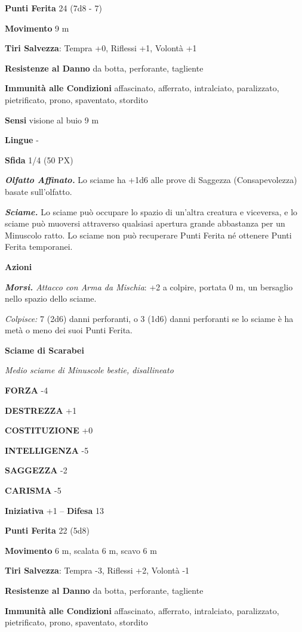 \begin{multicols}{2}
\textbf{Punti Ferita} 24 (7d8 - 7)

\textbf{Movimento} 9 m

\textbf{Tiri Salvezza}: Tempra +0, Riflessi +1, Volontà +1

\textbf{Resistenze al Danno} da botta, perforante, tagliente

\textbf{Immunità alle Condizioni} affascinato, afferrato, intralciato, paralizzato, pietrificato, prono, spaventato, stordito

\textbf{Sensi} visione al buio 9 m

\textbf{Lingue} -

\textbf{Sfida} 1/4 (50 PX)

\textit{\textbf{Olfatto Affinato.}} Lo sciame ha +1d6 alle prove di Saggezza (Consapevolezza) basate sull'olfatto.

\textit{\textbf{Sciame.}} Lo sciame può occupare lo spazio di un'altra creatura e viceversa, e lo sciame può muoversi attraverso qualsiasi apertura grande abbastanza per un Minuscolo ratto. Lo sciame non può recuperare Punti Ferita né ottenere Punti Ferita temporanei.

\textbf{Azioni}

\textit{\textbf{Morsi.} Attacco con Arma da Mischia}: +2 a colpire, portata 0 m, un bersaglio nello spazio dello sciame.

\textit{Colpisce:} 7 (2d6) danni perforanti, o 3 (1d6) danni perforanti se lo sciame è ha metà o meno dei suoi Punti Ferita.

\medskip\textbf{Sciame di Scarabei}

\textit{Medio sciame di Minuscole bestie, disallineato}

\textbf{FORZA} -4

\textbf{DESTREZZA} +1

\textbf{COSTITUZIONE} +0

\textbf{INTELLIGENZA} -5

\textbf{SAGGEZZA} -2

\textbf{CARISMA} -5

\textbf{Iniziativa} +1 -- \textbf{Difesa} 13

\textbf{Punti Ferita} 22 (5d8)

\textbf{Movimento} 6 m, scalata 6 m, scavo 6 m

\textbf{Tiri Salvezza}: Tempra -3, Riflessi +2, Volontà -1

\textbf{Resistenze al Danno} da botta, perforante, tagliente

\textbf{Immunità alle Condizioni} affascinato, afferrato, intralciato, paralizzato, pietrificato, prono, spaventato, stordito


\end{multicols}
